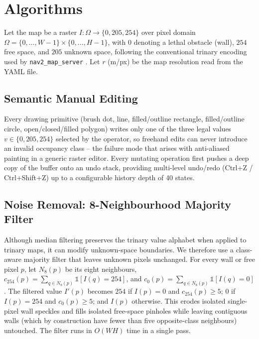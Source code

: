 \documentclass{IEEE_lsens}
\begin{document}
\section{Algorithms}
\label{sec:algorithms}
Let the map be a raster $I : \Omega \rightarrow \{0, 205, 254\}$ over pixel domain $\Omega = \{0,\dots,W-1\}\times\{0,\dots,H-1\}$, with $0$ denoting a lethal obstacle (wall), $254$ free space, and $205$ unknown space, following the conventional trinary encoding used by \texttt{nav2\_map\_server} \cite{nav2docs}. Let $r$ (m/px) be the map resolution read from the YAML file.

\subsection{Semantic Manual Editing}
Every drawing primitive (brush dot, line, filled/outline rectangle, filled/outline circle, open/closed/filled polygon) writes only one of the three legal values $v \in \{0,205,254\}$ selected by the operator, so freehand edits can never introduce an invalid occupancy class -- the failure mode that arises with anti-aliased painting in a generic raster editor. Every mutating operation first pushes a deep copy of the buffer onto an undo stack, providing multi-level undo/redo (Ctrl+Z / Ctrl+Shift+Z) up to a configurable history depth of 40 states.

\subsection{Noise Removal: 8-Neighbourhood Majority Filter}
Although median filtering preserves the trinary value alphabet when applied to trinary maps, it can modify unknown-space boundaries. We therefore use a class-aware majority filter that leaves unknown pixels unchanged. For every wall or free pixel $p$, let $N_8(p)$ be its eight neighbours, $c_{254}(p) = \sum_{q \in N_8(p)} \mathbb{1}[I(q)=254]$, and $c_{0}(p) = \sum_{q \in N_8(p)} \mathbb{1}[I(q)=0]$. The filtered value $I'(p)$ becomes $254$ if $I(p)=0$ and $c_{254}(p) \geq 5$; $0$ if $I(p)=254$ and $c_{0}(p) \geq 5$; and $I(p)$ otherwise. This erodes isolated single-pixel wall speckles and fills isolated free-space pinholes while leaving contiguous walls (which by construction have fewer than five opposite-class neighbours) untouched. The filter runs in $O(WH)$ time in a single pass.
\end{document}
